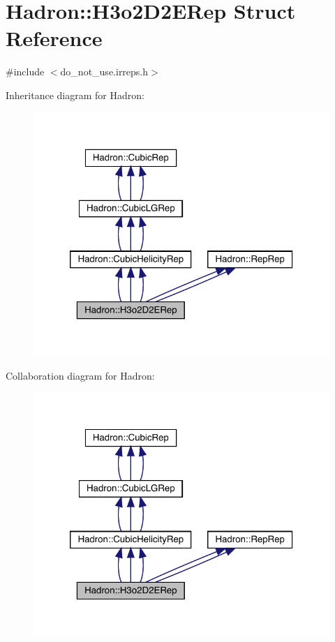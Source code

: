\hypertarget{structHadron_1_1H3o2D2ERep}{}\section{Hadron\+:\+:H3o2\+D2\+E\+Rep Struct Reference}
\label{structHadron_1_1H3o2D2ERep}


{\ttfamily \#include $<$do\+\_\+not\+\_\+use.\+irreps.\+h$>$}



Inheritance diagram for Hadron\+:
\nopagebreak
\begin{figure}[H]
\begin{center}
\leavevmode
\includegraphics[width=320pt]{d9/dd4/structHadron_1_1H3o2D2ERep__inherit__graph}
\end{center}
\end{figure}


Collaboration diagram for Hadron\+:
\nopagebreak
\begin{figure}[H]
\begin{center}
\leavevmode
\includegraphics[width=320pt]{db/df6/structHadron_1_1H3o2D2ERep__coll__graph}
\end{center}
\end{figure}
